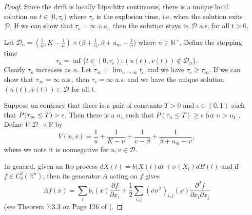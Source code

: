 \documentclass{aims}
\theoremstyle{definition}
\begin{document}
 \begin{proof}
 Since the drift is locally Lipschitz continuous, there is a unique
 local solution on $t\in[0,\tau_{e})$ where $\tau_{e}$ is the explosion
 time, i.e. when the solution exits $\mathcal{D}$. If we can show that $\tau_e=\infty$ a.s., then the solution stays in $\mathcal{D}$ a.s. for all $t>0$.  
 
 Let $\mathcal{D}_{n}=(\frac{1}{n},K-\frac{1}{n})\times(\beta+\frac{1}{n},\beta+u_{m}-\frac{1}{n}$)
 where $n\in\mathbb{N}^{+}$. Define the stopping time 
 \[
 \tau_{n}=\inf\{t\in(0,\tau_{e}):(u(t),v(t))\notin\mathcal{D}_{n}\}.
 \]
 Clearly $\tau_{n}$ increases as $n$. Let $\tau_{\infty}=\lim_{n\to\infty}t_{n}$
 and we have $\tau_{e}\ge\tau_{\infty}$. If we can show that $\tau_{\infty}=\infty$
 a.s., then $\tau_{e}=\infty$ a.s. and we have the unique solution
 $(u(t),v(t))\in\mathcal{D}$ for all $t$.
 
 Suppose on contrary that there is a pair of constants $T>0$ and $\epsilon\in(0,1)$ such that
  $P(\tau_{\infty}\le T)>\text{\ensuremath{\epsilon}}$. Then there
 is a $n_{1}$ such that  $P(\tau_{n}\le T)\ge\epsilon$ for $n>n_{1}$
 . Define $V:\mathcal{D}\to\mathbb{R}$ by
 \begin{equation}
 V(u,v)=\frac{1}{u}+\frac{1}{K-u}+\frac{1}{v-\beta}+\frac{1}{\beta+u_{m}-v},\label{eq:V(u,v)}
 \end{equation}
 where we note it is nonnegative for $u,v\in\mathcal{D}$. 
 
 In general, given an Ito process $dX(t)=b(X(t)dt+\sigma(X_t)dB(t)$ and if $f \in C_0^2(\mathbb{R}^n)$, then its generator $A$ acting on $f$ gives $$Af(x) = \sum_i b_i(x) \frac{\partial f}{\partial x_i} + \frac{1}{2} \sum_{i,j} (\sigma \sigma^T)_{i,j}(x) \frac{\partial^2 f}{\partial x_i \partial x_j}$$ (see Theorem 7.3.3 on Page 126 of \cite{OksendalSDEBook}).
 

\end{proof}
\end{document}
